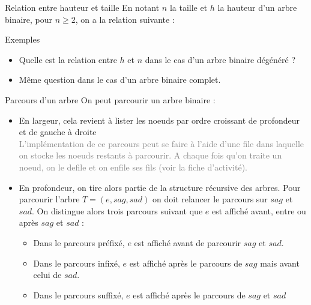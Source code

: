 \documentclass[10pt]{beamer}
\begin{document}
\begin{frame}
	\mframe{\AB}
	\begin{alertblock}{Relation entre hauteur et taille}
		En notant $n$ la taille et $h$ la hauteur d'un arbre binaire, pour $n \geq 2$, on a la relation suivante : \\
		\onslide<2->{$$ \boxed{ h \leq n \leq 2^{h}-1} $$}
	\end{alertblock}
	\begin{exampleblock}{Exemples}
		\begin{itemize}
			\item<3-> Quelle est la relation entre $h$ et $n$ dans le cas d'un arbre binaire dégénéré ?
			\item<4-> Même question dans le cas d'un arbre binaire complet.
		\end{itemize}
	\end{exampleblock}
\end{frame}


\begin{frame}
	\mframe{\AB}
	\begin{alertblock}{Parcours d'un arbre}
		On peut parcourir un arbre binaire :
		\begin{itemize}
			\item<2-> En largeur, cela revient à lister les noeuds par ordre croissant de profondeur et de gauche à droite \\
			      \onslide<3-> \textcolor{gray}{L'implémentation de ce parcours peut se faire à l'aide d'une file dans laquelle on stocke les noeuds restants à parcourir. A chaque fois qu'on traite un noeud, on le defile et on enfile ses fils (voir la fiche d'activité).}
			\item<3-> En profondeur, on tire alors partie de la structure récursive des arbres. Pour parcourir l'arbre $T=(e,sag,sad)$ on doit relancer le parcours sur $sag$ et $sad$. On distingue alors trois parcours suivant que $e$ est affiché avant, entre ou après $sag$ et $sad$ :
			      \begin{itemize}
				      \item<4-> Dans le parcours préfixé, $e$ est affiché avant de parcourir $sag$ et $sad$.
				      \item<5-> Dans le parcours infixé, $e$ est affiché après le parcours de $sag$ mais avant celui de  $sad$.
				      \item<6-> Dans le parcours suffixé, $e$ est affiché après le parcours de $sag$ et $sad$
			      \end{itemize}
		\end{itemize}
	\end{alertblock}
\end{frame}
\end{document}
